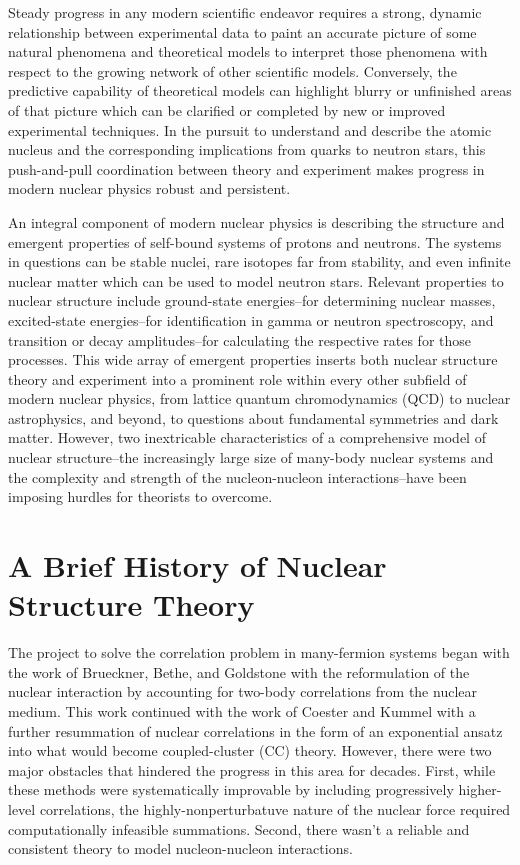 \documentclass[../thesis.tex]{subfiles}
\begin{document}
Steady progress in any modern scientific endeavor requires a strong, dynamic relationship between experimental data to paint an accurate picture of some natural phenomena and theoretical models to interpret those phenomena with respect to the growing network of other scientific models. Conversely, the predictive capability of theoretical models can highlight blurry or unfinished areas of that picture which can be clarified or completed by new or improved experimental techniques. In the pursuit to understand and describe the atomic nucleus and the corresponding implications from quarks to neutron stars, this push-and-pull coordination between theory and experiment makes progress in modern nuclear physics robust and persistent.

An integral component of modern nuclear physics is describing the structure and emergent properties of self-bound systems of protons and neutrons. The systems in questions can be stable nuclei, rare isotopes far from stability, and even infinite nuclear matter which can be used to model neutron stars. Relevant properties to nuclear structure include ground-state energies--for determining nuclear masses, excited-state energies--for identification in gamma or neutron spectroscopy, and transition or decay amplitudes--for calculating the respective rates for those processes. This wide array of emergent properties inserts both nuclear structure theory and experiment into a prominent role within every other subfield of modern nuclear physics, from lattice quantum chromodynamics (QCD) to nuclear astrophysics, and beyond, to questions about fundamental symmetries and dark matter.  However, two inextricable characteristics of a comprehensive model of nuclear structure--the increasingly large size of many-body nuclear systems and the complexity and strength of the nucleon-nucleon interactions--have been imposing hurdles for theorists to overcome.


\section{A Brief History of Nuclear Structure Theory}

The project to solve the correlation problem in many-fermion systems began with the work of Brueckner, Bethe, and Goldstone \cite{BRUECKNER19551344,BETHE19561353,GOLDSTONE1957267} with the reformulation of the nuclear interaction by accounting for two-body correlations from the nuclear medium.  This work continued with the work of Coester and Kummel \cite{COESTER1958421,COESTER1960477,KUMMEL19781} with a further resummation of nuclear correlations in the form of an exponential ansatz into what would become coupled-cluster (CC) theory.  However, there were two major obstacles that hindered the progress in this area for decades.  First, while these methods were systematically improvable by including progressively higher-level correlations, the highly-nonperturbatuve nature of the nuclear force required computationally infeasible summations.  Second, there wasn't a reliable and consistent theory to model nucleon-nucleon interactions.
\end{document}
